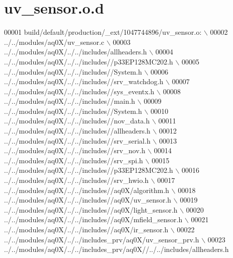 \hypertarget{a00074_source}{\section{uv\+\_\+sensor.\+o.\+d}
\label{a00074_source}
}

\begin{DoxyCode}
00001 build/\textcolor{keywordflow}{default}/production/\_ext/1047744896/uv\_sensor.o:  \(\backslash\)
00002  ../../modules/aq0X/uv\_sensor.c  \(\backslash\)
00003 ../../modules/aq0X/../../includes/allheaders.h  \(\backslash\)
00004 ../../modules/aq0X/../../includes\textcolor{comment}{//p33EP128MC202.h  \(\backslash\)}
00005 \textcolor{comment}{../../modules/aq0X/../../includes//System.h  \(\backslash\)}
00006 \textcolor{comment}{../../modules/aq0X/../../includes//srv\_watchdog.h  \(\backslash\)}
00007 \textcolor{comment}{../../modules/aq0X/../../includes//sys\_eventx.h  \(\backslash\)}
00008 \textcolor{comment}{../../modules/aq0X/../../includes//main.h  \(\backslash\)}
00009 \textcolor{comment}{../../modules/aq0X/../../includes//System.h  \(\backslash\)}
00010 \textcolor{comment}{../../modules/aq0X/../../includes//nov\_data.h  \(\backslash\)}
00011 \textcolor{comment}{../../modules/aq0X/../../includes//allheaders.h  \(\backslash\)}
00012 \textcolor{comment}{../../modules/aq0X/../../includes//srv\_serial.h  \(\backslash\)}
00013 \textcolor{comment}{../../modules/aq0X/../../includes//srv\_nov.h  \(\backslash\)}
00014 \textcolor{comment}{../../modules/aq0X/../../includes//srv\_spi.h  \(\backslash\)}
00015 \textcolor{comment}{../../modules/aq0X/../../includes//p33EP128MC202.h  \(\backslash\)}
00016 \textcolor{comment}{../../modules/aq0X/../../includes//srv\_hwio.h  \(\backslash\)}
00017 \textcolor{comment}{../../modules/aq0X/../../includes//aq0X/algorithm.h  \(\backslash\)}
00018 \textcolor{comment}{../../modules/aq0X/../../includes//aq0X/uv\_sensor.h  \(\backslash\)}
00019 \textcolor{comment}{../../modules/aq0X/../../includes//aq0X/light\_sensor.h  \(\backslash\)}
00020 \textcolor{comment}{../../modules/aq0X/../../includes//aq0X/mfield\_sensor.h  \(\backslash\)}
00021 \textcolor{comment}{../../modules/aq0X/../../includes//aq0X/ir\_sensor.h  \(\backslash\)}
00022 \textcolor{comment}{../../modules/aq0X/../../includes\_prv/aq0X/uv\_sensor\_prv.h  \(\backslash\)}
00023 \textcolor{comment}{../../modules/aq0X/../../includes\_prv/aq0X//../../includes/allheaders.h }
\end{DoxyCode}
